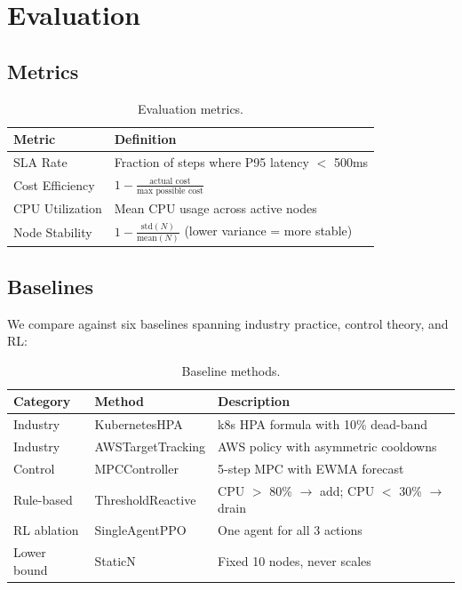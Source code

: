\documentclass[12pt,a4paper]{article}
\begin{document}
\section{Evaluation}


\subsection{Metrics}

\begin{table}[H]
\centering
\caption{Evaluation metrics.}
\begin{tabular}{lp{9cm}}
\toprule
\textbf{Metric} & \textbf{Definition} \\
\midrule
SLA Rate & Fraction of steps where P95 latency $<$ 500ms \\
Cost Efficiency & $1 - \frac{\text{actual cost}}{\text{max possible cost}}$ \\
CPU Utilization & Mean CPU usage across active nodes \\
Node Stability & $1 - \frac{\text{std}(N)}{\text{mean}(N)}$ (lower variance = more stable) \\
\bottomrule
\end{tabular}
\end{table}

\subsection{Baselines}

We compare against six baselines spanning industry practice, control theory,
and RL:

\begin{table}[H]
\centering
\caption{Baseline methods.}
\begin{tabular}{llp{6cm}}
\toprule
\textbf{Category} & \textbf{Method} & \textbf{Description} \\
\midrule
Industry & KubernetesHPA & k8s HPA formula with 10\% dead-band \\
Industry & AWSTargetTracking & AWS policy with asymmetric cooldowns \\
Control & MPCController & 5-step MPC with EWMA forecast \cite{zhang2023aware} \\
Rule-based & ThresholdReactive & CPU $>$ 80\% $\rightarrow$ add; CPU $<$ 30\% $\rightarrow$ drain \\
RL ablation & SingleAgentPPO & One agent for all 3 actions \\
Lower bound & StaticN & Fixed 10 nodes, never scales \\
\bottomrule
\end{tabular}
\end{table}
\end{document}
